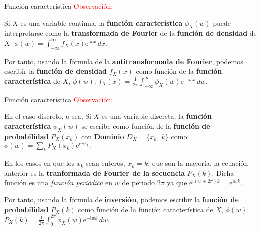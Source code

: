 \documentclass[
  ignorenonframetext,
  aspectratio=169]{beamer}
\newcommand\red[1]{\textcolor{red}{#1}}
\begin{document}
\begin{frame}{Función característica}
\protect\hypertarget{funciuxf3n-caracteruxedstica-1}{}
\red{Observación:}

Si \(X\) es una variable continua, la \textbf{función característica}
\(\phi_X(w)\) puede interpretarse como la \textbf{transformada de
Fourier} de la \textbf{función de densidad} de \(X\):
\(\phi(w)=\int_{-\infty}^\infty f_X(x)\mathrm{e}^{\mathrm{i}w x}\, dx.\)

Por tanto, usando la fórmula de la \textbf{antitransformada de Fourier},
podemos escribir la \textbf{función de densidad} \(f_X(x)\) como función
de la \textbf{función característica} de \(X\), \(\phi(w)\):
\(f_X(x)=\frac{1}{2\pi}\int_{-\infty}^\infty \phi_X(w)\mathrm{e}^{-\mathrm{i}w x}\, dw.\)
\end{frame}

\begin{frame}{Función característica}
\protect\hypertarget{funciuxf3n-caracteruxedstica-2}{}
\red{Observación:}

En el caso discreto, o sea, Si \(X\) es una variable discreta, la
\textbf{función característica} \(\phi_X(w)\) se escribe como función de
la \textbf{función de probabilidad} \(P_X(x_k)\) con \textbf{Dominio}
\(D_X=\{x_k,\ k\}\) como:
\(\phi(w)=\sum_{k} P_X(x_k)\mathrm{e}^{\mathrm{i}w x_k}.\)

En los casos en que los \(x_k\) sean enteros, \(x_k=k\), que son la
mayoría, la ecuación anterior es la \textbf{tranformada de Fourier de la
secuencia} \(P_X(k)\). Dicha función es una \emph{función periódica} en
\(w\) de periodo \(2\pi\) ya que
\(\mathrm{e}^{\mathrm{i}(w+2\pi)k}=\mathrm{e}^{\mathrm{i}wk}.\)

Por tanto, usando la fórmula de \textbf{inversión}, podemos escribir la
\textbf{función de probabilidad} \(P_X(k)\) como función de la función
característica de \(X\), \(\phi(w)\):
\(P_X(k)=\frac{1}{2\pi}\int_{0}^{2\pi} \phi_X(w)\mathrm{e}^{-\mathrm{i}w k}\, dw.\)
\end{frame}
\end{document}
